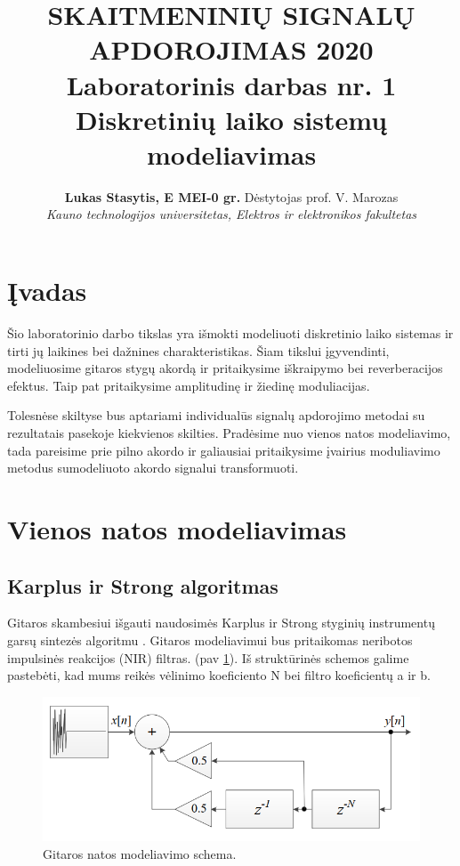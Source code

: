 \documentclass[10pt,a4paper,twocolumn]{article}
\title{{\large SKAITMENINIŲ SIGNALŲ APDOROJIMAS 2020}\\ \vspace{-12pt} 
{\normalsize{ Laboratorinis darbas nr. 1}}\\
{\Large \textbf{Diskretinių laiko sistemų modeliavimas}}}
\author{\large \textbf{Lukas Stasytis, E MEI-0 gr.} Dėstytojas prof. V. Marozas\\
{\normalsize \textit{Kauno technologijos universitetas, Elektros ir elektronikos fakultetas}}}
\date{}
\begin{document}
\maketitle

\section*{Įvadas}

Šio laboratorinio darbo tikslas yra išmokti modeliuoti diskretinio laiko sistemas ir tirti jų laikines bei dažnines charakteristikas. Šiam tikslui įgyvendinti, modeliuosime gitaros stygų akordą ir pritaikysime iškraipymo bei reverberacijos efektus. Taip pat pritaikysime amplitudinę ir žiedinę moduliacijas.

Tolesnėse skiltyse bus aptariami individualūs signalų apdorojimo metodai su rezultatais pasekoje kiekvienos skilties. Pradėsime nuo vienos natos modeliavimo, tada pareisime prie pilno akordo ir galiausiai pritaikysime įvairius moduliavimo metodus sumodeliuoto akordo signalui transformuoti.


\section*{Vienos natos modeliavimas}

\subsection*{Karplus ir Strong algoritmas}
Gitaros skambesiui išgauti naudosimės Karplus ir Strong styginių instrumentų garsų sintezės algoritmu \cite{karplus-strong}. Gitaros modeliavimui bus pritaikomas neribotos impulsinės reakcijos (NIR) filtras. (pav \ref{karplus_strong}). Iš struktūrinės schemos galime pastebėti, kad mums reikės vėlinimo koeficiento N bei filtro koeficientų a ir b. 

\begin{figure} %
	[!h]
	\centering
	\includegraphics*[width=.8\columnwidth]{strong_diagrama.png} %
	\caption{Gitaros natos modeliavimo schema.}
	\label{karplus_strong}
	\vspace{6pt}
\end{figure}
\end{document}
